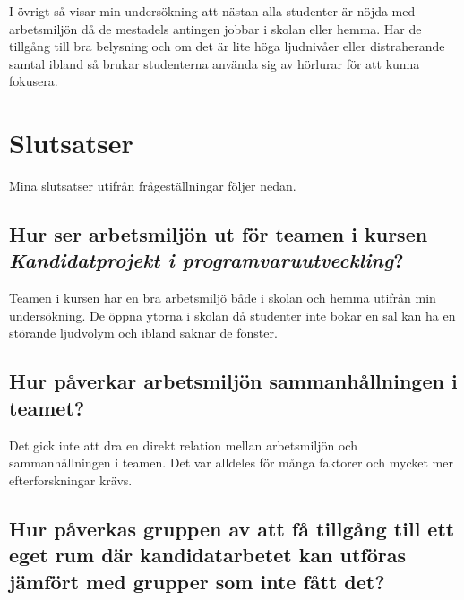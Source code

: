 I övrigt så visar min undersökning att nästan alla studenter är nöjda med arbetsmiljön då de mestadels antingen jobbar i skolan eller hemma. Har de tillgång till bra belysning och om det är lite höga ljudnivåer eller distraherande samtal ibland så brukar studenterna använda sig av hörlurar för att kunna fokusera. 

\section{Slutsatser}
\label{sec:conclusions-hampus}
Mina slutsatser utifrån frågeställningar följer nedan.

\subsection{Hur ser arbetsmiljön ut för teamen i kursen \textit{Kandidatprojekt i programvaruutveckling}?}
Teamen i kursen har en bra arbetsmiljö både i skolan och hemma utifrån min undersökning. De öppna ytorna i skolan då studenter inte bokar en sal kan ha en störande ljudvolym och ibland saknar de fönster. 

\subsection{Hur påverkar arbetsmiljön sammanhållningen i teamet?}
Det gick inte att dra en direkt relation mellan arbetsmiljön och sammanhållningen i teamen. Det var alldeles för många faktorer och mycket mer efterforskningar krävs.

\subsection{Hur påverkas gruppen av att få tillgång till ett eget rum där kandidatarbetet kan utföras jämfört med grupper som inte fått det?}


